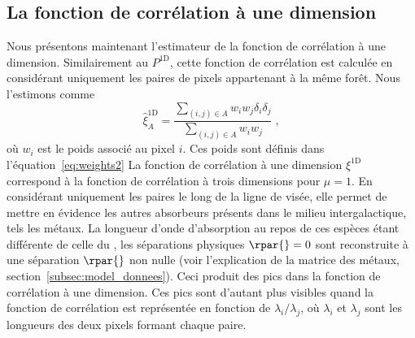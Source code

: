 \subsection{La fonction de corrélation à une dimension}
\label{subsec:cf1d_estimateur}
  Nous présentons maintenant l'estimateur de la fonction de corrélation à une dimension. Similairement au $P^{\mathrm{1D}}$, cette fonction de corrélation est calculée en considérant uniquement les paires de pixels appartenant à la même forêt.
  Nous l'estimons comme
  \begin{equation}
\hat    \xi^{\mathrm{1D}}_A  = \frac{
      \sum\limits_{(i,j)\in A} w_i w_j \delta_i \delta_j
    }{
      \sum\limits_{(i,j)\in A} w_i w_j
    }
    \; ,
  \end{equation}
  où $w_i$ est le poids associé au pixel $i$. Ces poids sont définis dans l'équation~\ref{eq:weights2}
  La fonction de corrélation à une dimension $\xi^{\mathrm{1D}}$ correspond à la fonction de corrélation à trois dimensions pour $\mu = 1$. En considérant uniquement les paires le long de la ligne de visée, elle permet de mettre en évidence les autres absorbeurs présents dans le milieu intergalactique, tels les métaux. La longueur d'onde d'absorption au repos de ces espèces étant différente de celle du \lya{}, les séparations physiques $\rpar{}=0$ sont reconstruite à une séparation $\rpar{}$ non nulle (voir l'explication de la matrice des métaux, section~\ref{subsec:model_donnees}). Ceci produit des pics dans la fonction de corrélation à une dimension. Ces pics sont d'autant plus visibles quand la fonction de corrélation est représentée en fonction de $\lambda_i / \lambda_j$, où $\lambda_i$ et $\lambda_j$ sont les longueurs des deux pixels formant chaque paire.


